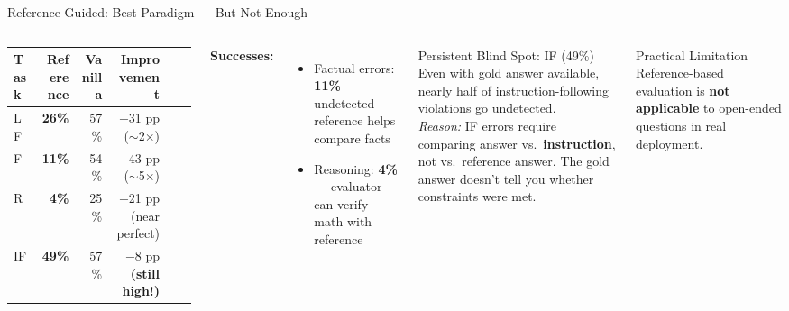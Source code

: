 \documentclass[aspectratio=169,10pt]{beamer}
\newcommand{\good}[1]{\textcolor{green!60!black}{\textbf{#1}}}
\newcommand{\bad}[1]{\textcolor{aclred}{\textbf{#1}}}
\begin{document}
\begin{frame}{Reference-Guided: Best Paradigm — But Not Enough}
  \begin{columns}[T]
      \small
      \begin{tabular}{lrrrrr}
        \toprule
        \textbf{Task} & \textbf{Reference} & \textbf{Vanilla} & \textbf{Improvement} \\
        \midrule
        LF  & \good{26\%} & 57\% & $-$31 pp ($\sim$2$\times$) \\
        F   & \good{11\%} & 54\% & $-$43 pp ($\sim$5$\times$) \\
        R   & \good{4\%}  & 25\% & $-$21 pp (near perfect) \\
        IF  & \bad{49\%}  & 57\% & $-$8 pp \textbf{(still high!)} \\
        \bottomrule
      \end{tabular}

      \vspace{0.5em}
      \textbf{Successes:}
      \begin{itemize}
        \item Factual errors: \good{11\%} undetected — reference helps compare facts
        \item Reasoning: \good{4\%} — evaluator can verify math with reference
      \end{itemize}

      \begin{alertblock}{Persistent Blind Spot: IF (49\%)}
        Even with gold answer available, nearly half of instruction-following violations go undetected.\\[0.4em]
        \textit{Reason:} IF errors require comparing answer vs.\ \textbf{instruction}, not vs.\ reference answer. The gold answer doesn't tell you whether constraints were met.
      \end{alertblock}

      \vspace{0.3em}
      \begin{block}{Practical Limitation}
        Reference-based evaluation is \textbf{not applicable} to open-ended questions in real deployment.
      \end{block}
  \end{columns}
\end{frame}
\end{document}

